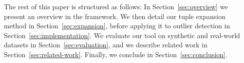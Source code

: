 The rest of this paper is structured as follows: In Section~\ref{sec:overview} we present an overview in the framework. We then detail our tuple expansion method in Section~\ref{sec:expansion}, before applying it to outlier detection in Section~\ref{sec:implementation}. We evaluate our tool on synthetic and real-world datasets in Section~\ref{sec:evaluation}, and we describe related work in Section~\ref{sec:related-work}. Finally, we conclude in Section~\ref{sec:conclusion}. %
